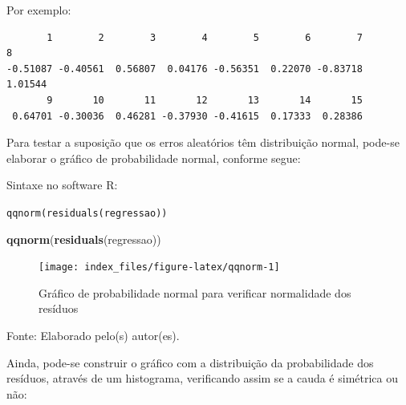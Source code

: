 \documentclass[12pt,brazil,oneside]{book}
\newenvironment{Shaded}{\begin{snugshade}}{\end{snugshade}}
\newcommand{\DataTypeTok}[1]{\textcolor[rgb]{0.13,0.29,0.53}{#1}}
\newcommand{\KeywordTok}[1]{\textcolor[rgb]{0.13,0.29,0.53}{\textbf{#1}}}
\newcommand{\NormalTok}[1]{#1}
\newcommand{\OperatorTok}[1]{\textcolor[rgb]{0.81,0.36,0.00}{\textbf{#1}}}
\newcommand{\OtherTok}[1]{\textcolor[rgb]{0.56,0.35,0.01}{#1}}
\newcommand{\StringTok}[1]{\textcolor[rgb]{0.31,0.60,0.02}{#1}}
\begin{document}
Por exemplo:

\begin{Shaded}
\end{Shaded}

\begin{verbatim}
       1        2        3        4        5        6        7        8 
-0.51087 -0.40561  0.56807  0.04176 -0.56351  0.22070 -0.83718  1.01544 
       9       10       11       12       13       14       15 
 0.64701 -0.30036  0.46281 -0.37930 -0.41615  0.17333  0.28386 
\end{verbatim}

Para testar a suposição que os erros aleatórios têm distribuição normal, pode-se elaborar o gráfico de probabilidade normal, conforme segue:

Sintaxe no software R:

\texttt{qqnorm(residuals(regressao))}

\begin{Shaded}
\begin{Highlighting}[]
\KeywordTok{qqnorm}\NormalTok{(}\KeywordTok{residuals}\NormalTok{(regressao))}
\end{Highlighting}
\end{Shaded}

\begin{figure}[H]

{\centering \texttt{[image: index\_files/figure-latex/qqnorm-1]} 

}

\caption{Gráfico de probabilidade normal para verificar normalidade dos resíduos}\label{fig:qqnorm}
\end{figure}

Fonte: Elaborado pelo(s) autor(es).

Ainda, pode-se construir o gráfico com a distribuição da probabilidade dos resíduos, através de um histograma, verificando assim se a cauda é simétrica ou não:

\begin{Shaded}
\end{Shaded}
\end{document}
